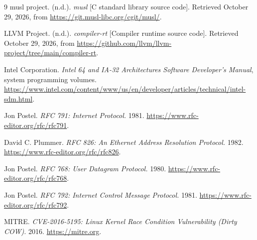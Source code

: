 \documentclass[11pt,a4paper]{scrartcl}
\begin{document}
\begin{thebibliography}{9}
musl project. (n.d.). \emph{musl} [C standard library source code].
Retrieved October 29, 2026, from \url{https://git.musl-libc.org/cgit/musl/}.

LLVM Project. (n.d.). \emph{compiler-rt} [Compiler runtime source code].
Retrieved October 29, 2026, from
\url{https://github.com/llvm/llvm-project/tree/main/compiler-rt}.

Intel Corporation. \emph{Intel 64 and IA-32 Architectures Software
Developer's Manual}, system programming volumes.
\url{https://www.intel.com/content/www/us/en/developer/articles/technical/intel-sdm.html}.

Jon Postel. \emph{RFC 791: Internet Protocol.} 1981.
\url{https://www.rfc-editor.org/rfc/rfc791}.

David C. Plummer. \emph{RFC 826: An Ethernet Address Resolution Protocol.} 1982.
\url{https://www.rfc-editor.org/rfc/rfc826}.

Jon Postel. \emph{RFC 768: User Datagram Protocol.} 1980.
\url{https://www.rfc-editor.org/rfc/rfc768}.

Jon Postel. \emph{RFC 792: Internet Control Message Protocol.} 1981.
\url{https://www.rfc-editor.org/rfc/rfc792}.

MITRE. \emph{CVE-2016-5195: Linux Kernel Race Condition Vulnerability (Dirty COW).} 2016.
\url{https://mitre.org}.

\end{thebibliography}
\end{document}
